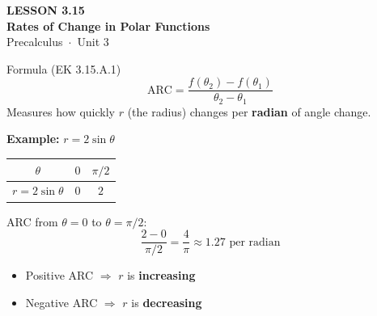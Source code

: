 \documentclass[aspectratio=169, 11pt]{beamer}
\begin{document}
{
\begin{frame}[plain]
  \vspace{2.8cm}\hspace{0.55cm}%
  \begin{minipage}{0.9\textwidth}
    {\color{goldacc}\bfseries\small LESSON 3.15}\\[0.5cm]
    {\color{white}\bfseries\LARGE Rates of Change in Polar Functions}\\[1.2cm]
    {\color{skymid}\small Precalculus~$\cdot$~Unit 3}
  \end{minipage}
\end{frame}
}

\begin{frame}[t, plain]

  \begin{block}{Formula (EK 3.15.A.1)}
    $$\text{ARC} = \frac{f(\theta_2) - f(\theta_1)}{\theta_2 - \theta_1}$$
    Measures how quickly $r$ (the radius) changes per \textbf{radian} of angle change.
  \end{block}

  \vspace{0.3cm}
  \textbf{Example:} $r = 2\sin\theta$

  \vspace{0.2cm}
  \begin{tabular}{|c|c|c|}
    \hline
    $\theta$ & $0$ & $\pi/2$ \\
    \hline
    $r = 2\sin\theta$ & $0$ & $2$ \\
    \hline
  \end{tabular}

  \vspace{0.3cm}
  ARC from $\theta = 0$ to $\theta = \pi/2$:
  $$\frac{2 - 0}{\pi/2} = \frac{4}{\pi} \approx 1.27 \text{ per radian}$$

  \vspace{0.2cm}
  \begin{itemize}
    \item Positive ARC $\Rightarrow$ $r$ is \textbf{increasing}
    \item Negative ARC $\Rightarrow$ $r$ is \textbf{decreasing}
  \end{itemize}
\end{frame}
\end{document}
